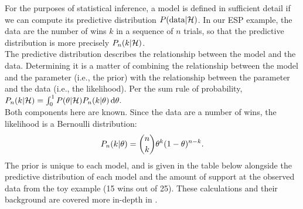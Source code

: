 \begin{tcolorbox}[title=Box~2: Model definitions and equations,code={\singlespacing}]
For the purposes of statistical inference, a model is defined in sufficient detail if we can compute its predictive distribution $P(\text{data}|{\mathcal{H}})$.  In our ESP example, the data are the number of wins $k$ in a sequence of $n$ trials, so that the predictive distribution is more precisely $P_n(k|{\mathcal{H}})$.\\[-1ex]

The predictive distribution describes the relationship between the model and the data.  Determining it is a matter of combining the relationship between the model and the parameter (i.e., the prior) with the relationship between the parameter and the data (i.e., the likelihood). Per the sum rule of probability, $P_n(k|{\mathcal{H}}) = \int_0^1 P(\theta|{\mathcal{H}}) P_n(k|\theta) \mathop{}\!\mathrm{d}\theta.$\\[-1ex]

Both components here are known.  Since the data are a number of wins, the likelihood is a Bernoulli distribution: $$P_n(k|\theta) = \binom{n}{k} \theta^k (1-\theta)^{n-k}.$$ The prior is unique to each model, and is given in the table below alongside the predictive distribution of each model and the amount of support at the observed data from the toy example (15 wins out of 25). These calculations and their background are covered more in-depth in .\\


\end{tcolorbox}
